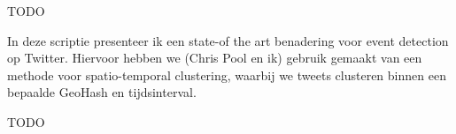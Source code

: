 






\newpage
\tableofcontents
\newpage
{}

TODO

\newpage
\null\vspace{\fill}

{}
\begin{center}
In deze scriptie presenteer ik een state-of the art benadering voor event detection op Twitter. Hiervoor hebben we (Chris Pool en ik)
gebruik gemaakt van een methode voor spatio-temporal clustering, waarbij we tweets clusteren binnen een bepaalde GeoHash en tijdsinterval.
\end{center}
\vspace{\fill}
\newpage


TODO


